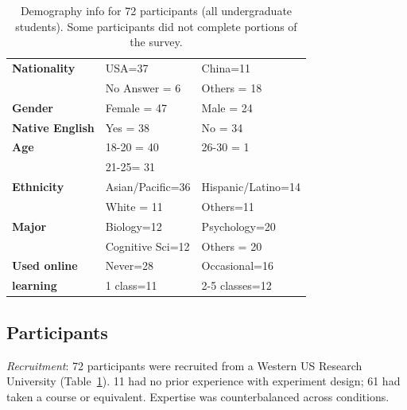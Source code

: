 \vspace{0.25in}
\begin{table}[!ht]
\caption[Demography information for 72 participants (all undergraduate students)] 
{Demography info for 72 participants (all undergraduate students). Some participants did not complete portions of the survey.}

\vspace{-0.25in}
\begin{center}
\begin{tabular}{>{\bf}p{1.5in}p{1.5in}p{1.5in}}
Nationality	&	USA=37		&	China=11\\
			&	No Answer = 6	&	Others = 18\\
Gender		&	Female = 47	&	Male = 24\\
Native English	&	Yes = 38 		&	No = 34\\
Age			&	18-20 = 40	& 	26-30 = 1\\
			&	21-25= 31	&			\\
Ethnicity		&	Asian/Pacific=36 & 	Hispanic/Latino=14\\
			&	White = 11		&	Others=11 \\
Major		&	Biology=12	& 	Psychology=20 \\
			&	Cognitive Sci=12 &	 Others = 20 \\
Used online	& 	Never=28		&	Occasional=16\\
learning		&	1 class=11	&	2-5 classes=12\\
\end{tabular}
\end{center}
\label{tab:gi-results1}
\end{table}


\subsection*{Participants}
\textit{Recruitment}: 72 participants were recruited from a Western US Research University (Table~\ref{tab:gi-results1}). 11 had no prior experience with experiment design; 61 had taken a course or equivalent. Expertise was counterbalanced across conditions.   

